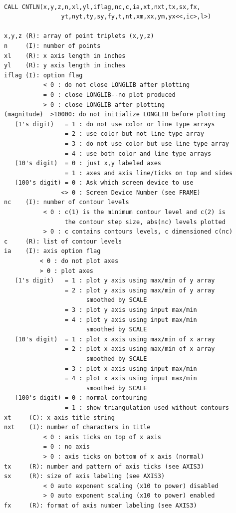 \documentclass[11pt]{report}
\begin{document}
\begin{verbatim}

CALL CNTLN(x,y,z,n,xl,yl,iflag,nc,c,ia,xt,nxt,tx,sx,fx,
                yt,nyt,ty,sy,fy,t,nt,xm,xx,ym,yx<<,ic>,l>)

x,y,z (R): array of point triplets (x,y,z)
n     (I): number of points
xl    (R): x axis length in inches
yl    (R): y axis length in inches
iflag (I): option flag
           < 0 : do not close LONGLIB after plotting
           = 0 : close LONGLIB--no plot produced
           > 0 : close LONGLIB after plotting
(magnitude)  >10000: do not initialize LONGLIB before plotting
   (1's digit)   = 1 : do not use color or line type arrays
                 = 2 : use color but not line type array
                 = 3 : do not use color but use line type array
                 = 4 : use both color and line type arrays
   (10's digit)  = 0 : just x,y labeled axes
                 = 1 : axes and axis line/ticks on top and sides
   (100's digit) = 0 : Ask which screen device to use
                <> 0 : Screen Device Number (see FRAME)
nc    (I): number of contour levels 
           < 0 : c(1) is the minimum contour level and c(2) is
                 the contour step size, abs(nc) levels plotted
           > 0 : c contains contours levels, c dimensioned c(nc)
c     (R): list of contour levels
ia    (I): axis option flag
          < 0 : do not plot axes
          > 0 : plot axes
   (1's digit)   = 1 : plot y axis using max/min of y array
                 = 2 : plot y axis using max/min of y array
                       smoothed by SCALE
                 = 3 : plot y axis using input max/min
                 = 4 : plot y axis using input max/min
                       smoothed by SCALE
   (10's digit)  = 1 : plot x axis using max/min of x array
                 = 2 : plot x axis using max/min of x array
                       smoothed by SCALE
                 = 3 : plot x axis using input max/min
                 = 4 : plot x axis using input max/min
                       smoothed by SCALE
   (100's digit) = 0 : normal contouring
                 = 1 : show triangulation used without contours
xt     (C): x axis title string
nxt    (I): number of characters in title
           < 0 : axis ticks on top of x axis
           = 0 : no axis
           > 0 : axis ticks on bottom of x axis (normal)
tx     (R): number and pattern of axis ticks (see AXIS3)
sx     (R): size of axis labeling (see AXIS3)
           < 0 auto exponent scaling (x10 to power) disabled
           > 0 auto exponent scaling (x10 to power) enabled
fx     (R): format of axis number labeling (see AXIS3)

\end{verbatim}
\end{document}
